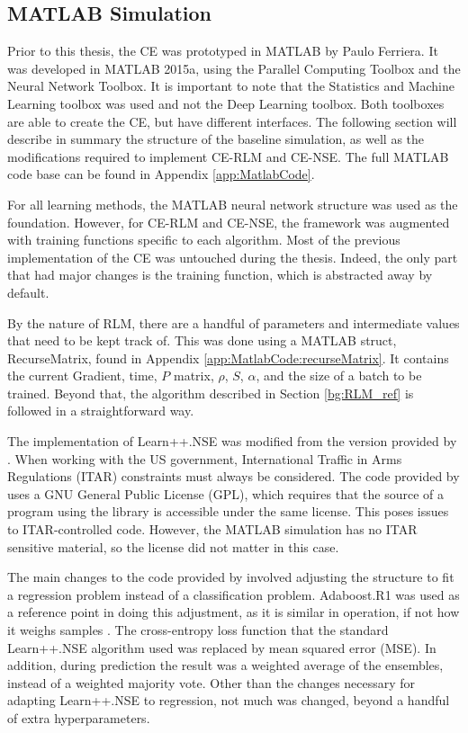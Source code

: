 \subsection{MATLAB Simulation}
\par Prior to this thesis, the CE was prototyped in MATLAB by Paulo Ferriera\cite{paulo_theory_paper}. It was developed in MATLAB 2015a, using the Parallel Computing Toolbox and the Neural Network Toolbox. It is important to note that the Statistics and Machine Learning toolbox was used and not the Deep Learning toolbox. Both toolboxes are able to create the CE, but have different interfaces. The following section will describe in summary the structure of the baseline simulation, as well as the modifications required to implement CE-RLM and CE-NSE. The full MATLAB code base can be found in Appendix \ref{app:MatlabCode}.
\par For all learning methods, the MATLAB neural network structure was used as the foundation. However, for CE-RLM and CE-NSE, the framework was augmented with training functions specific to each algorithm. Most of the previous implementation of the CE was untouched during the thesis. Indeed, the only part that had major changes is the training function, which is abstracted away by default. 
\par By the nature of RLM, there are a handful of parameters and intermediate values that need to be kept track of. This was done using a MATLAB struct, RecurseMatrix, found in Appendix \ref{app:MatlabCode:recurseMatrix}. It contains the current Gradient, time, $P$ matrix, $\rho$, $S$, $\alpha$, and the size of a batch to be trained. Beyond that, the algorithm described in Section \ref{bg:RLM_ref} is followed in a straightforward way.   
\par  The implementation of Learn++.NSE was modified from the version provided by \cite{learnpp_repo}. When working with the US government, International Traffic in Arms Regulations (ITAR) constraints must always be considered. The code provided by \cite{learnpp_repo} uses a GNU General Public License (GPL), which requires that the source of a program using the library is accessible under the same license. This poses issues to ITAR-controlled code. However, the MATLAB simulation has no ITAR sensitive material, so the license did not matter in this case.
\par The main changes to the code provided by \cite{learnpp_repo} involved adjusting the structure to fit a regression problem instead of a classification problem. Adaboost.R1 was used as a reference point in doing this adjustment, as it is similar in operation, if not how it weighs samples \cite{solomatine2004adaboost}. The cross-entropy loss function that the standard Learn++.NSE algorithm used \cite{learnNseIntro} was replaced by mean squared error (MSE). In addition, during prediction the result was a weighted average of the ensembles, instead of a weighted majority vote. Other than the changes necessary for adapting Learn++.NSE to regression, not much was changed, beyond a handful of extra hyperparameters. 

